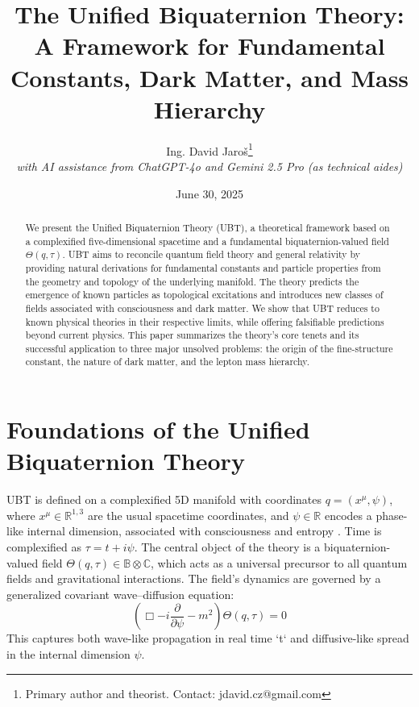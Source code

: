 \documentclass[12pt, a4paper]{article}
\title{\textbf{The Unified Biquaternion Theory: A Framework for Fundamental Constants, Dark Matter, and Mass Hierarchy}}
\author{Ing. David Jaroš\thanks{Primary author and theorist. Contact: jdavid.cz@gmail.com} \\
\textit{with AI assistance from ChatGPT-4o and Gemini 2.5 Pro (as technical aides)}}
\date{June 30, 2025}
\begin{document}
\maketitle

\begin{abstract}
We present the Unified Biquaternion Theory (UBT), a theoretical framework based on a complexified five-dimensional spacetime and a fundamental biquaternion-valued field \( \Theta(q, \tau) \). UBT aims to reconcile quantum field theory and general relativity by providing natural derivations for fundamental constants and particle properties from the geometry and topology of the underlying manifold. The theory predicts the emergence of known particles as topological excitations and introduces new classes of fields associated with consciousness and dark matter. We show that UBT reduces to known physical theories in their respective limits, while offering falsifiable predictions beyond current physics. This paper summarizes the theory's core tenets and its successful application to three major unsolved problems: the origin of the fine-structure constant, the nature of dark matter, and the lepton mass hierarchy.
\end{abstract}

\tableofcontents
\newpage

\section{Foundations of the Unified Biquaternion Theory}
UBT is defined on a complexified 5D manifold with coordinates \( q = (x^\mu, \psi) \), where \( x^\mu \in \mathbb{R}^{1,3} \) are the usual spacetime coordinates, and \( \psi \in \mathbb{R} \) encodes a phase-like internal dimension, associated with consciousness and entropy \cite{Jaros2025a}. Time is complexified as \( \tau = t + i\psi \). The central object of the theory is a biquaternion-valued field \( \Theta(q, \tau) \in \mathbb{B} \otimes \mathbb{C} \), which acts as a universal precursor to all quantum fields and gravitational interactions. The field's dynamics are governed by a generalized covariant wave–diffusion equation:
\[
\left( \Box - i \frac{\partial}{\partial \psi} - m^2 \right)\Theta(q, \tau) = 0
\]
This captures both wave-like propagation in real time `t` and diffusive-like spread in the internal dimension \( \psi \).
\end{document}

